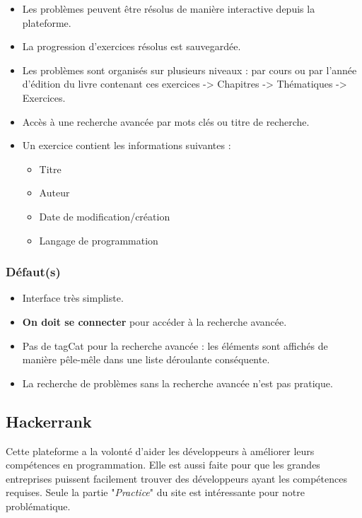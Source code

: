 \begin{itemize}
    \item Les problèmes peuvent être résolus de manière interactive depuis la plateforme.
    \item La progression d'exercices résolus est sauvegardée.
    \item Les problèmes sont organisés sur plusieurs niveaux : par cours ou par l'année d'édition du livre contenant ces exercices -> Chapitres -> Thématiques -> Exercices.
    \item Accès à une recherche avancée par mots clés ou titre de recherche.
    \item Un exercice contient les informations suivantes :
    \begin{itemize}
        \item Titre
        \item Auteur
        \item Date de modification/création
        \item Langage de programmation
    \end{itemize}
\end{itemize}

\subsubsection*{Défaut(s)}

\begin{itemize}
    \item Interface très simpliste.
    \item \textbf{On doit se connecter} pour accéder à la recherche avancée.
    \item Pas de \gls{tagCat} pour la recherche avancée : les éléments sont affichés de manière pêle-mêle dans une liste déroulante conséquente.
    \item La recherche de problèmes sans la recherche avancée n'est pas pratique.
\end{itemize}

\pagebreak
\subsection*{Hackerrank}

Cette plateforme a la volonté d'aider les développeurs à améliorer leurs compétences en programmation. Elle est aussi faite pour que les grandes entreprises puissent facilement trouver des développeurs ayant les compétences requises. Seule la partie "\textit{Practice}" du site est intéressante pour notre problématique.

